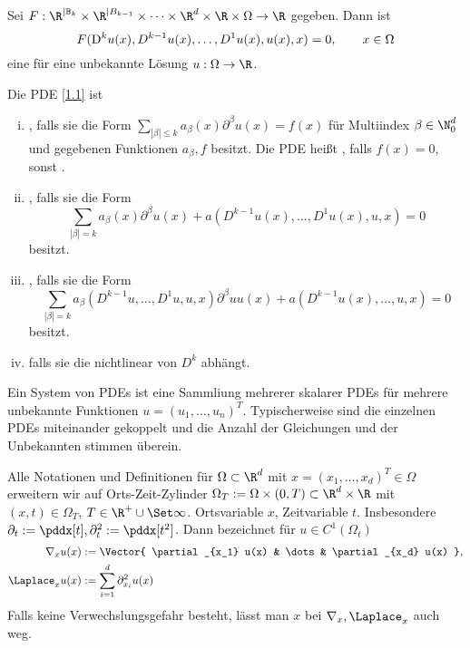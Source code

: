 \begin{df} \label{1.8}
	Sei $F: \R^{|\mathbb{B}_k} \times \R^{|B_{k-1}} \times \dotsb \times \R^d \times \R \times \Omega \to \R$ gegeben.
	Dann ist
	\[ \label{eq:1.1}
		F(\mathrm{D}^k u(x), D^{k-1} u(x), \dotsc, D^1 u(x), u(x), x) = 0,
		\qquad x \in \Omega
	\]
	eine  für eine unbekannte Lösung $u: \Omega \to \R$.
\end{df}

\begin{df} \label{1.9}
	Die PDE \eqref{1.1} ist
	\begin{enumerate}[i)]
		\item
			, falls sie die Form $\sum_{|\beta| \le k} a_\beta(x) \partial^\beta u(x) = f(x)$ für Multiindex $\beta \in \N_0^d$ und gegebenen Funktionen $a_\beta, f$ besitzt.
			Die PDE heißt , falls $f(x) = 0$, sonst .
		\item
			, falls sie die Form
			\[
				\sum_{|\beta| = k} a_\beta(x) \partial^\beta u(x) + a (D^{k-1} u(x), \dotsc, D^1 u(x), u, x) = 0
			\]
			besitzt.
		\item
			, falls sie die Form
			\[
				\sum_{|\beta| = k} a_\beta(D^{k-1}u, \dotsc, D^1 u, u, x) \partial^\beta uu(x) + a(D^{k-1} u(x), \dotsc, u, x) = 0
			\]
			besitzt.
		\item
			 falls sie die nichtlinear von $D^k$ abhängt.
	\end{enumerate}
	\begin{note}[Systeme]
		Ein System von PDEs ist eine Sammliung mehrerer skalarer PDEs für mehrere unbekannte Funktionen $u = (u_1, \dotsc, u_n)^T$.
		Typischerweise sind die einzelnen PDEs miteinander gekoppelt und die Anzahl der Gleichungen und der Unbekannten stimmen überein. 
	\end{note}
	\begin{note}
		Alle Notationen und Definitionen für $\Omega \subset \R^d$ mit $x = (x_1, \dotsc, x_d)^T \in \Omega$ erweitern wir auf Orts-Zeit-Zylinder $\Omega_T := \Omega \times (0, T) \subset \R^d \times \R$ mit $(x,t) \in \Omega_T$, $T \in \R^+ \cup \Set \infty$.
		Ortsvariable $x$, Zeitvariable $t$.
		Insbesondere $\partial_t := \pddx[t], \partial_t^2 := \pddx[t^2]$.
		Dann bezeichnet für $u \in C^1(\Omega_t)$
		\begin{align*}
			\nabla_x u(x) &:= \Vector{ \partial_{x_1} u(x) & \dots & \partial_{x_d} u(x) }, \\
			\Laplace_x u(x) &:= \sum_{i=1}^d \partial_{x_i}^2 u(x)
		\end{align*}
		Falls keine Verwechslungsgefahr besteht, lässt man $x$ bei $\nabla_x, \Laplace_x$ auch weg.
	\end{note}
\end{df}

